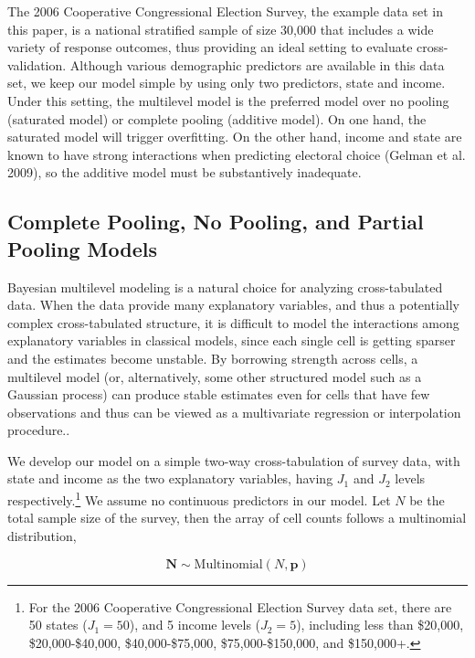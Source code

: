 The 2006 Cooperative Congressional Election Survey, the example data set
in this paper, is a national stratified sample of size 30,000 that
includes a wide variety of response outcomes, thus providing an ideal
setting to evaluate cross-validation. Although various demographic
predictors are available in this data set, we keep our model simple by
using only two predictors, state and income. Under this setting, the
multilevel model is the preferred model over no pooling (saturated
model) or complete pooling (additive model). On one hand, the saturated
model will trigger overfitting. On the other hand, income and state are
known to have strong interactions when predicting electoral choice
(Gelman et al. 2009), so the additive model must be substantively
inadequate.

\subsection{Complete Pooling, No Pooling, and Partial Pooling
Models}\label{complete-pooling-no-pooling-and-partial-pooling-models}

Bayesian multilevel modeling is a natural choice for analyzing
cross-tabulated data. When the data provide many explanatory variables,
and thus a potentially complex cross-tabulated structure, it is
difficult to model the interactions among explanatory variables in
classical models, since each single cell is getting sparser and the
estimates become unstable. By borrowing strength across cells, a
multilevel model (or, alternatively, some other structured model such as
a Gaussian process) can produce stable estimates even for cells that
have few observations and thus can be viewed as a multivariate
regression or interpolation procedure..

We develop our model on a simple two-way cross-tabulation of survey
data, with state and income as the two explanatory variables, having
\(J_1\) and \(J_2\) levels
respectively.\footnote{For the 2006 Cooperative Congressional Election Survey
  data set, there are 50 states ($J_1=50$), and 5 income levels ($J_2=5$),
  including less than \$20,000, \$20,000-\$40,000, \$40,000-\$75,000,
  \$75,000-\$150,000, and \$150,000+.} We assume no continuous
predictors in our model. Let \(N\) be the total sample size of the
survey, then the array of cell counts follows a multinomial
distribution,

\begin{equation*}\bm{N}\sim \text{Multinomial}(N, \bm{p})\end{equation*}

